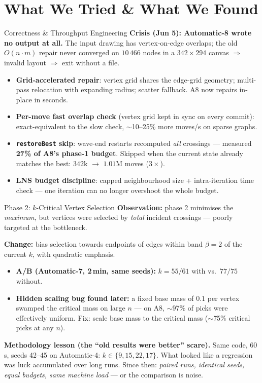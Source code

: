 \section{What We Tried \& What We Found}

\begin{frame}{Correctness \& Throughput Engineering}
  \textbf{Crisis (Jun 5): Automatic-8 wrote no output at all.} The input drawing has
  vertex-on-edge overlaps; the old $O(n\cdot m)$ repair never converged on $10\,466$ nodes
  in a $342{\times}294$ canvas $\Rightarrow$ invalid layout $\Rightarrow$ exit without a file.
  \medskip
  \begin{itemize}
    \item \textbf{Grid-accelerated repair}: vertex grid shares the edge-grid geometry;
          multi-pass relocation with expanding radius; scatter fallback. A8 now repairs
          in-place in seconds.
    \item \textbf{Per-move fast overlap check} (vertex grid kept in sync on every commit):
          exact-equivalent to the slow check, $\sim$10--25\% more moves/s on sparse graphs.
    \item \textbf{\texttt{restoreBest} skip}: wave-end restarts recomputed \emph{all} crossings
          --- measured \textbf{27\% of A8's phase-1 budget}. Skipped when the current state
          already matches the best: $342$k $\to$ $1.01$M moves ($3\times$).
    \item \textbf{LNS budget discipline}: capped neighbourhood size + intra-iteration time
          check --- one iteration can no longer overshoot the whole budget.
  \end{itemize}
\end{frame}

\begin{frame}{Phase 2: $k$-Critical Vertex Selection}
  \textbf{Observation:} phase 2 minimises the \emph{maximum}, but vertices were selected by
  \emph{total} incident crossings --- poorly targeted at the bottleneck.
  \medskip

  \textbf{Change:} bias selection towards endpoints of edges within band $\beta=2$ of the
  current $k$, with quadratic emphasis.
  \begin{itemize}
    \item \textbf{A/B (Automatic-7, 2\,min, same seeds):} $k=55/61$ with vs.\ $77/75$ without.
    \item \textbf{Hidden scaling bug found later:} a fixed base mass of $0.1$ per vertex
          swamped the critical mass on large $n$ --- on A8, $\sim$97\% of picks were
          effectively uniform. Fix: scale base mass to the critical mass
          ($\sim$75\% critical picks at any $n$).
  \end{itemize}
  \medskip
  \textbf{Methodology lesson (the ``old results were better'' scare).} Same code, 60\,s,
  seeds 42--45 on Automatic-4: $k\in\{9,15,22,17\}$. What looked like a regression was
  luck accumulated over long runs. Since then: \emph{paired runs, identical seeds, equal
  budgets, same machine load} --- or the comparison is noise.
\end{frame}

